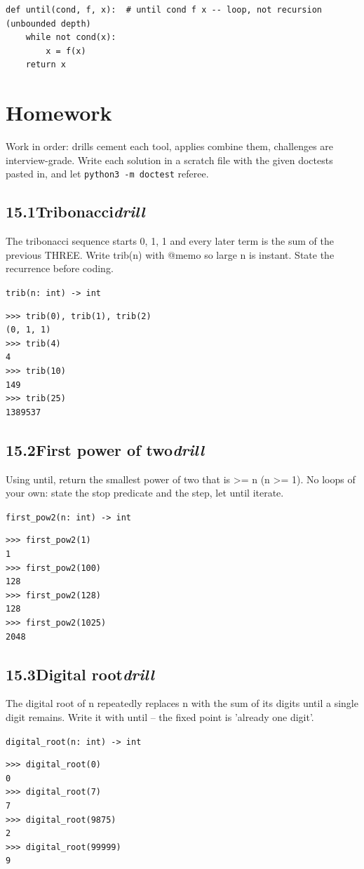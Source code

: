 \documentclass[10pt,letterpaper]{book}
\begin{document}
\begin{lstlisting}[style=ex]
def until(cond, f, x):  # until cond f x -- loop, not recursion (unbounded depth)
    while not cond(x):
        x = f(x)
    return x
\end{lstlisting}
\section{Homework}
Work in order: drills cement each tool, applies combine them,
challenges are interview-grade. Write each solution in a scratch file with
the given doctests pasted in, and let \texttt{python3 -m doctest} referee.
\subsection*{15.1\quad Tribonacci\hfill\textnormal{\textit{drill}}}
The tribonacci sequence starts 0, 1, 1 and every later term is the sum of the previous THREE. Write trib(n) with @memo so large n is instant. State the recurrence before coding.

\noindent\texttt{trib(n: int) -> int}
\begin{lstlisting}[style=ex]
>>> trib(0), trib(1), trib(2)
(0, 1, 1)
>>> trib(4)
4
>>> trib(10)
149
>>> trib(25)
1389537
\end{lstlisting}
\subsection*{15.2\quad First power of two\hfill\textnormal{\textit{drill}}}
Using until, return the smallest power of two that is >= n (n >= 1). No loops of your own: state the stop predicate and the step, let until iterate.

\noindent\texttt{first\_pow2(n: int) -> int}
\begin{lstlisting}[style=ex]
>>> first_pow2(1)
1
>>> first_pow2(100)
128
>>> first_pow2(128)
128
>>> first_pow2(1025)
2048
\end{lstlisting}
\subsection*{15.3\quad Digital root\hfill\textnormal{\textit{drill}}}
The digital root of n repeatedly replaces n with the sum of its digits until a single digit remains. Write it with until -- the fixed point is 'already one digit'.

\noindent\texttt{digital\_root(n: int) -> int}
\begin{lstlisting}[style=ex]
>>> digital_root(0)
0
>>> digital_root(7)
7
>>> digital_root(9875)
2
>>> digital_root(99999)
9
\end{lstlisting}
\end{document}
